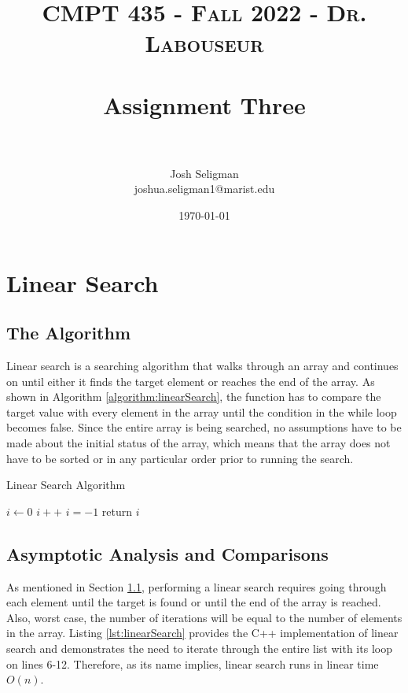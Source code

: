 \documentclass[letterpaper, 10pt,DIV=13]{scrartcl}
\title{	
   \normalfont \normalsize 
   \textsc{CMPT 435 - Fall 2022 - Dr. Labouseur} \\[10pt] %
   \horrule{0.5pt} \\[0.25cm] 	%
   \huge Assignment Three  \\     	    %
   \horrule{0.5pt} \\[0.25cm] 	%
}
\author{Josh Seligman \\ \normalsize joshua.seligman1@marist.edu}
\date{\normalsize\today} 	%
\numberwithin{equation}{section} %
\numberwithin{figure}{section} %
\numberwithin{table}{section} %
\begin{document}
\maketitle %

\section{Linear Search}
\subsection{The Algorithm}\label{linearSearch}
Linear search is a searching algorithm that walks through an array and continues on until either it finds the target element or reaches the end of the array. As shown in Algorithm \ref{algorithm:linearSearch}, the function has to compare the target value with every element in the array until the condition in the while loop becomes false. Since the entire array is being searched, no assumptions have to be made about the initial status of the array, which means that the array does not have to be sorted or in any particular order prior to running the search.

\begin{algorithm}
  \caption{Linear Search Algorithm}
  \label{algorithm:linearSearch}
  \begin{algorithmic}[1]
        \State $i \gets 0$ 
         
          \State $i++$
        \EndWhile
          \State $i = -1$ 
        \EndIf
        \State return $i$
      \EndProcedure
  \end{algorithmic}
\end{algorithm}

\subsection{Asymptotic Analysis and Comparisons}
As mentioned in Section \ref{linearSearch}, performing a linear search requires going through each element until the target is found or until the end of the array is reached. Also, worst case, the number of iterations will be equal to the number of elements in the array. Listing \ref{lst:linearSearch} provides the C++ implementation of linear search and demonstrates the need to iterate through the entire list with its loop on lines 6-12. Therefore, as its name implies, linear search runs in linear time $O(n)$.
\end{document}
